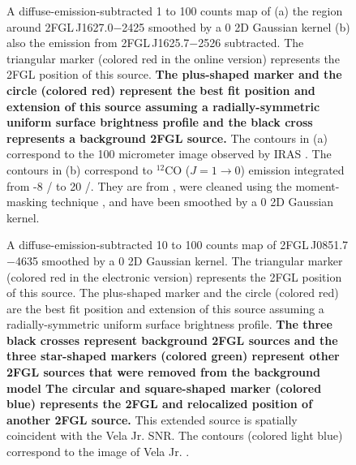 \documentclass[12pt,preprint]{aastex}
\newif\ifcolorfigure
\newcommand{\gev}{\text{GeV}\xspace}
\newcommand{\tev}{\text{TeV}\xspace}
\newcommand{\s}{\text{s}\xspace}
\newcommand{\km}{\text{km}\xspace}
\newcommand{\newtext}[1]{{\bfseries \color{red}#1}}
\begin{document}
\begin{figure}
    \ifcolorfigure
      \plotone{source_plots/source_Ophiuchus_color.eps}
    \else
    \fi
  \caption{
  A diffuse-emission-subtracted 1 \gev to 100 \gev counts map of (a) the region
  around 2FGL\,J1627.0$-$2425 smoothed by a 0 2D Gaussian kernel (b)
  also the emission from 2FGL\,J1625.7$-$2526
  subtracted.  The triangular marker 
  (colored red in the
  online version) represents the 2FGL position of this source.
  \newtext{
  The plus-shaped marker and the circle (colored red) 
  represent the best fit position and extension of this
  source assuming a radially-symmetric uniform surface brightness profile
  and the black cross represents a background 2FGL source. 
  }
  The
  contours in (a) correspond to the 100 micrometer image observed by
  IRAS \citep{iras_rho_ophiuci}.  The contours in (b) correspond to
  ${}^{12}\text{CO}$ ($J=1\rightarrow 0$) emission integrated from -8 \km/\s
  to 20 \km/\s.  They are from \cite{co_rho_ophiuci}, were cleaned using
  the moment-masking technique \citep{masking_moment_2011}, and have
  been smoothed by a 0 2D Gaussian kernel.
  }\label{1FGL_J1628.6-2419c}
\end{figure}



\begin{figure}
    \ifcolorfigure
      \plotone{source_plots/source_Vela_Jr_color.eps}
    \else
    \fi
  \caption{A diffuse-emission-subtracted 10 \gev to 100 \gev counts map of
  2FGL\,J0851.7$-$4635 smoothed by a 0 2D Gaussian
  kernel. The triangular marker (colored red in the electronic version)
  represents the 2FGL position of this source.  The plus-shaped marker
  and the circle (colored red) are the best fit position and extension of
  this source assuming a radially-symmetric uniform surface brightness profile.
  \newtext{
  The three black crosses represent background 2FGL sources
  and the three star-shaped markers (colored green) represent other 2FGL sources
  that were removed from the background model 
  The circular and square-shaped
  marker (colored blue) represents the 2FGL and relocalized position of another 2FGL source.  
  }
  This extended source is spatially
  coincident with the Vela Jr. SNR.  The contours (colored light blue)
  correspond to the \tev image of Vela Jr.
  \citep{vela_jr_hess}.
  }\label{Vela_Jr}
\end{figure}
\end{document}

